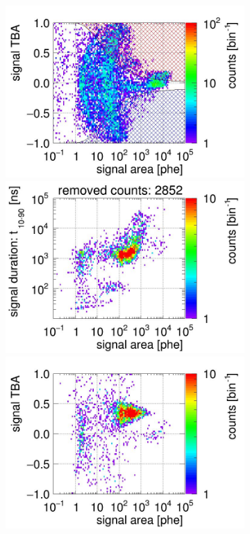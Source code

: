 \begin{landscape}
\begin{figure}[!p]
\begin{subfigure}[t]{0.32\textwidth}
			\includegraphics[width=\figurewidth,clip,trim={0 98 0 40}]{Figures/GasTest/CutsValid/res64765/tbapa26Vecfig64765.jpg}
			\includegraphics[width=\figurewidth,clip,trim={0 98 0 15}]{Figures/GasTest/CutsValid/res64765/pdpaX26Vecfig64765.jpg}
			\includegraphics[width=\figurewidth,clip,trim={0 8 0 40}]{Figures/GasTest/CutsValid/res64765/tbapaX26Vecfig64765.jpg}

\end{subfigure}
\end{figure}
\end{landscape}
